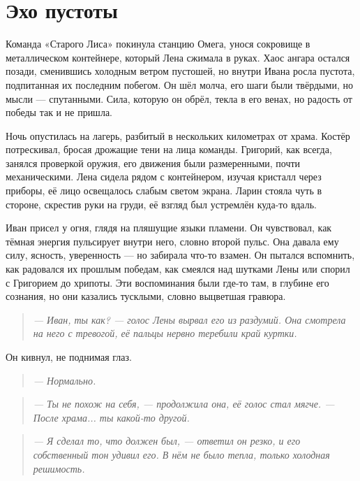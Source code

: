 \documentclass[12pt,a4paper]{book} %
\newenvironment{dialogue}{\begin{quote}\itshape}{\end{quote}}
\begin{document}
\chapter{Эхо пустоты}

Команда «Старого Лиса» покинула станцию Омега, унося сокровище в металлическом контейнере, который Лена сжимала в руках. Хаос ангара остался позади, сменившись холодным ветром пустошей, но внутри Ивана росла пустота, подпитанная их последним побегом. Он шёл молча, его шаги были твёрдыми, но мысли --- спутанными. Сила, которую он обрёл, текла в его венах, но радость от победы так и не пришла.

Ночь опустилась на лагерь, разбитый в нескольких километрах от храма. Костёр потрескивал, бросая дрожащие тени на лица команды. Григорий, как всегда, занялся проверкой оружия, его движения были размеренными, почти механическими. Лена сидела рядом с контейнером, изучая кристалл через приборы, её лицо освещалось слабым светом экрана. Ларин стояла чуть в стороне, скрестив руки на груди, её взгляд был устремлён куда-то вдаль.

Иван присел у огня, глядя на пляшущие языки пламени. Он чувствовал, как тёмная энергия пульсирует внутри него, словно второй пульс. Она давала ему силу, ясность, уверенность --- но забирала что-то взамен. Он пытался вспомнить, как радовался их прошлым победам, как смеялся над шутками Лены или спорил с Григорием до хрипоты. Эти воспоминания были где-то там, в глубине его сознания, но они казались тусклыми, словно выцветшая гравюра.

\begin{dialogue}
--- Иван, ты как? --- голос Лены вырвал его из раздумий. Она смотрела на него с тревогой, её пальцы нервно теребили край куртки.
\end{dialogue}

Он кивнул, не поднимая глаз.

\begin{dialogue}
--- Нормально.
\end{dialogue}

\begin{dialogue}
--- Ты не похож на себя, --- продолжила она, её голос стал мягче. --- После храма... ты какой-то другой.
\end{dialogue}

\begin{dialogue}
--- Я сделал то, что должен был, --- ответил он резко, и его собственный тон удивил его. В нём не было тепла, только холодная решимость.
\end{dialogue}
\end{document}
